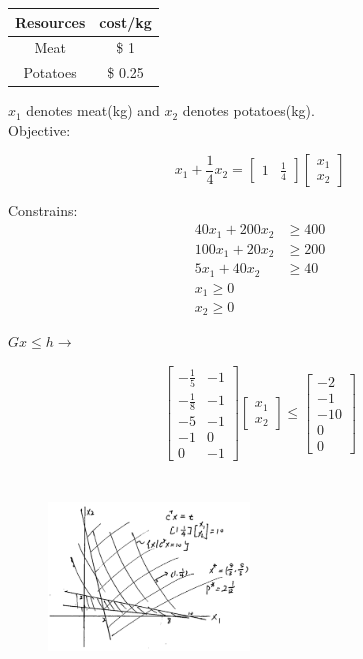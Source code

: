 \begin{tabular}{|c|c|}
	\hline 
	Resources&cost/kg\\
	\hline  
	Meat &\$ 1\\
	\hline 
	Potatoes &\$ 0.25\\
	\hline 
\end{tabular}

$x_1$ denotes meat(kg) and $x_2$ denotes potatoes(kg).\\


Objective:

\begin{equation*}
x_1 + \frac{1}{4}x_2 = 
\begin{bmatrix}
1 & \frac{1}{4}
\end{bmatrix}
\begin{bmatrix}
x_1\\
x_2
\end{bmatrix}
\end{equation*}

Constrains:
\begin{align*}
40x_1 + 200x_2 &\geq 400\\
100x_1 + 20x_2 &\geq 200\\
5x_1 + 40x_2 &\geq 40\\
x_1 \geq 0\\
x_2 \geq 0
\end{align*}

$Gx\leq h \rightarrow$ 

\begin{equation*}
\begin{bmatrix}
-\frac{1}{5} & -1\\
-\frac{1}{8} & -1\\
-5 & -1\\
-1 & 0\\
0 & -1
\end{bmatrix}
\begin{bmatrix}
x_1\\
x_2
\end{bmatrix}\leq
\begin{bmatrix}
-2\\
-1\\
-10\\
0\\
0
\end{bmatrix}
\end{equation*}

\begin{figure}
	\centering
	\includegraphics[width=2.1in,height=2.1in]{figures/ch06/figure5.png}
\end{figure}
